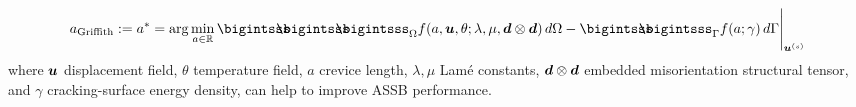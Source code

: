 \documentclass[25pt, a0paper,
portrait,
margin=2mm, 
innermargin=2mm, 
blockverticalspace=7mm, %
colspace=2mm, %
subcolspace=0mm]{tikzposter}
\makeatletter
\newcommand*{\inputfig}[3][htb]{{
    \def\fps@figure{#1}
    \def\DIR{#2}
    \def\LABEL{#3}
    \graphicspath{{\DIR/}}
    
}}
\makeatother
\begin{document}
{\begin{minipage}{0.56\textwidth}
\begin{mdframed}
			\begin{align*}
				a_{\text{Griffith}} := a^{*} = \arg\min_{a\in\mathbb{R}}{\bigintsss\!\!\!\!\!\!\bigintsss\!\!\!\!\!\!\bigintsss_{\Omega} f(a,\bm{u},\theta;\lambda,\mu,\bm{d}\otimes\bm{d}) \, d\Omega - \bigintsss\!\!\!\!\!\!\bigintsss_{\Gamma} f(a;\gamma) \, d\Gamma}\Bigg|_{\bm{u}^{(s)}}
			\end{align*}
			where 
			${\boldsymbol{\mathnormal u}}$ displacement field, 
			$\theta$ temperature field, 
			$a$ crevice length,
			$\lambda, \mu$ Lam\'{e} constants,
			${\boldsymbol{\mathnormal d}}\otimes{\boldsymbol{\mathnormal d}}$ embedded misorientation structural tensor,
			and 
			$\gamma$ cracking-surface energy density,
			can help to improve ASSB performance.
		\end{mdframed}
	\end{minipage}%
	\hfill
	\begin{minipage}{0.44\textwidth}
		\begin{center}
			\inputfig{floats/routine_woTV_spectral}{routine_woTV_spectral}
		\end{center}

\end{minipage}}
\end{document}
